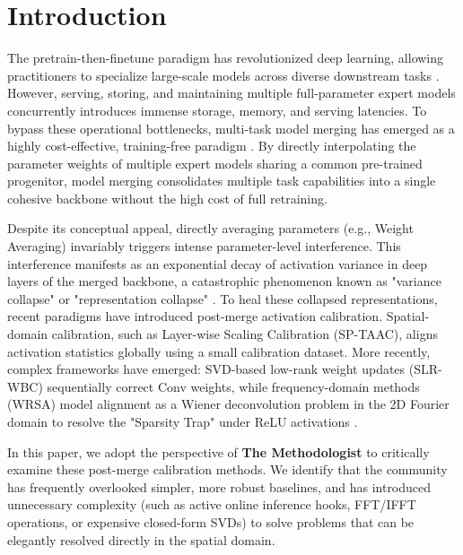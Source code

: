 \documentclass{article}
\theoremstyle{plain}
\theoremstyle{definition}
\theoremstyle{remark}
\begin{document}
\section{Introduction}
\label{sec:intro}
The pretrain-then-finetune paradigm has revolutionized deep learning, allowing practitioners to specialize large-scale models across diverse downstream tasks \citep{Vaswani2017}. However, serving, storing, and maintaining multiple full-parameter expert models concurrently introduces immense storage, memory, and serving latencies. To bypass these operational bottlenecks, multi-task model merging has emerged as a highly cost-effective, training-free paradigm \citep{Wortsman2022, Ilharco2022}. By directly interpolating the parameter weights of multiple expert models sharing a common pre-trained progenitor, model merging consolidates multiple task capabilities into a single cohesive backbone without the high cost of full retraining.

Despite its conceptual appeal, directly averaging parameters (e.g., Weight Averaging) invariably triggers intense parameter-level interference. This interference manifests as an exponential decay of activation variance in deep layers of the merged backbone, a catastrophic phenomenon known as "variance collapse" or "representation collapse" \citep{Jordan2023}. To heal these collapsed representations, recent paradigms have introduced post-merge activation calibration. Spatial-domain calibration, such as Layer-wise Scaling Calibration (SP-TAAC), aligns activation statistics globally using a small calibration dataset. More recently, complex frameworks have emerged: SVD-based low-rank weight updates (SLR-WBC) sequentially correct Conv weights, while frequency-domain methods (WRSA) model alignment as a Wiener deconvolution problem in the 2D Fourier domain to resolve the "Sparsity Trap" under ReLU activations \citep{Anonymous2025, Anonymous2026}.

In this paper, we adopt the perspective of \textbf{The Methodologist} to critically examine these post-merge calibration methods. We identify that the community has frequently overlooked simpler, more robust baselines, and has introduced unnecessary complexity (such as active online inference hooks, FFT/IFFT operations, or expensive closed-form SVDs) to solve problems that can be elegantly resolved directly in the spatial domain.
\end{document}
